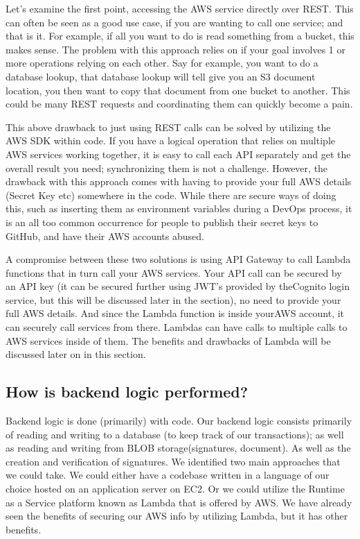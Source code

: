 \documentclass[runningheads]{llncs}
\begin{document}
Let's examine the first point, accessing the AWS service directly over REST. This can often be seen as a good use case, if you are wanting to call one service; and that is it. For example, if all you want to do is read something from a bucket, this makes sense. The problem with this approach relies on if your goal involves 1 or more operations relying on each other. Say for example, you want to do a database lookup, that database lookup will tell give you an S3 document location, you then want to copy that document from one bucket to another. This could be many REST requests and coordinating them can quickly become a pain.

This above drawback to just using REST calls can be solved by utilizing the AWS SDK within code. If you have a logical operation that relies on multiple AWS services working together, it is easy to call each API separately and get the overall result you need; synchronizing them is not a challenge. However, the drawback with this approach comes with having to provide your full AWS details (Secret Key etc) somewhere in the code. While there are secure ways of doing this, such as inserting them as environment variables during a DevOps process, it is an all too common occurrence for people to publish their secret keys to GitHub, and have their AWS accounts abused.

A compromise between these two solutions is using API Gateway to call Lambda functions that in turn call your AWS services. Your API call can be secured by an API  key (it can be secured further using JWT's provided by theCognito login service, but this will be discussed later in the section), no need to provide your full AWS details. And since the Lambda function is inside yourAWS account, it can securely call services from there. Lambdas can have calls to multiple calls to AWS services inside of them. The benefits and drawbacks of Lambda will be discussed later on in this section.

\subsection{How is backend logic performed?}
Backend logic is done (primarily) with code. Our backend logic consists primarily of reading and writing to a database (to keep track of our transactions); as well as reading and writing from BLOB storage(signatures, document). As well as the creation and verification of signatures. We identified two main approaches that we could take. We could either have a codebase written in a language of our choice hosted on an application server on EC2. Or we could utilize the Runtime as a Service platform known as Lambda that is offered by AWS. We have already seen the benefits of securing our AWS info by utilizing Lambda, but it has other benefits.
\end{document}
